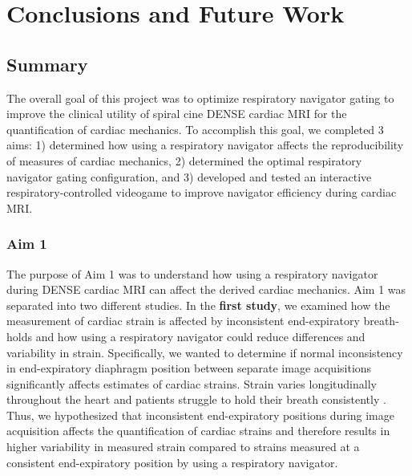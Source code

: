 \chapter{Conclusions and Future Work}

\section{Summary}
	The overall goal of this project was to optimize respiratory navigator gating to improve the clinical utility of spiral cine DENSE cardiac MRI for the quantification of cardiac mechanics. To accomplish this goal, we completed 3 aims: 1) determined how using a respiratory navigator affects the reproducibility of measures of cardiac mechanics, 2) determined the optimal respiratory navigator gating configuration, and 3) developed and tested an interactive respiratory-controlled videogame to improve navigator efficiency during cardiac MRI.

\subsection{Aim 1}
	The purpose of Aim 1 was to understand how using a respiratory navigator during DENSE cardiac MRI can affect the derived cardiac mechanics. Aim 1 was separated into two different studies. In the \textbf{first study}, we examined how the measurement of cardiac strain is affected by inconsistent end-expiratory breath-holds and how using a respiratory navigator could reduce differences and variability in strain. Specifically, we wanted to determine if normal inconsistency in end-expiratory diaphragm position between separate image acquisitions significantly affects estimates of cardiac strains. Strain varies longitudinally throughout the heart \cite{Kuijer2002,Moore2000,Young1994a,Feng2009,NasiraeiMoghaddam2010,Donekal2013a,Suever2017} and patients struggle to hold their breath consistently \cite{Liu1993,Wang1995a,Taylor1997a,Holland1998c,Fischer2006a}. Thus, we hypothesized that inconsistent end-expiratory positions during image acquisition affects the quantification of cardiac strains and therefore results in higher variability in measured strain compared to strains measured at a consistent end-expiratory position by using a respiratory navigator.


